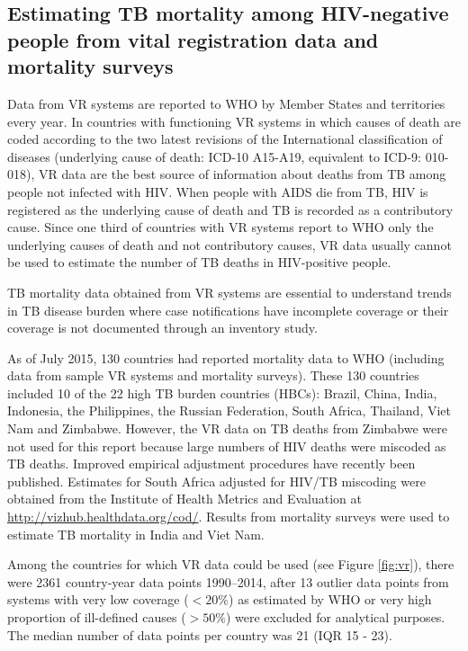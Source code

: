 \subsection{Estimating TB mortality among HIV-negative people from vital registration data and mortality surveys}

Data from VR systems are reported to WHO by Member States and territories every year. In countries with functioning VR systems in which causes of death are coded according to the two latest revisions of the International classification of diseases (underlying cause of death: ICD-10 A15-A19, equivalent to ICD-9: 010-018), VR data are the best source of information about deaths from TB among people not infected with HIV. When people with AIDS die from TB, HIV is registered as the underlying cause of death and TB is recorded as a contributory cause. Since one third of countries with VR systems report to WHO only the underlying causes of death and not contributory causes, VR data usually cannot be used to estimate the number of TB deaths in HIV-positive people. 

TB mortality data obtained from VR systems are essential to understand trends in TB disease burden where case notifications have incomplete coverage or their coverage is not documented through an inventory study. 

As of July 2015, 130 countries had reported mortality data to WHO (including data from sample VR systems and mortality surveys). These 130 countries included 10 of the 22 high TB burden countries (HBCs): Brazil, China, India, Indonesia, the Philippines, the Russian Federation, South Africa, Thailand, Viet Nam and Zimbabwe. However, the VR data on TB deaths from Zimbabwe were not used for this report because large numbers of HIV deaths were miscoded as TB deaths. Improved empirical adjustment procedures have recently been published\cite{21479092}. Estimates for South Africa adjusted for HIV/TB miscoding were obtained from the Institute of Health Metrics and Evaluation at \url{http://vizhub.healthdata.org/cod/}. Results from mortality surveys were used to estimate TB mortality in India and Viet Nam. 

Among the countries for which VR data could be used (see Figure \ref{fig:vr}), there were 2361 country-year data points 1990–2014, after 13 outlier data points from systems with very low coverage ($<20\%$) as estimated by WHO\cite{15798840} or very high proportion of ill-defined causes ($>50\%$) were excluded for analytical purposes. The median number of data points per country was 21 (IQR 15 - 23). 

